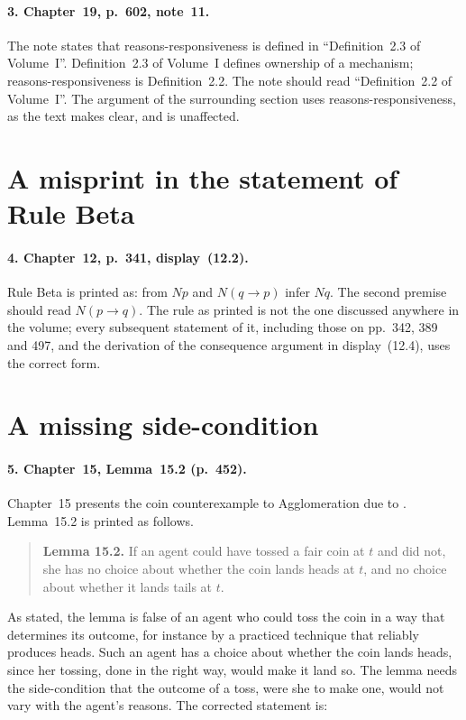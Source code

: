 \documentclass{situationist-preprint}
\begin{document}
\paragraph{3. Chapter~19, p.~602, note~11.} The note states that reasons-responsiveness is defined in \enquote{Definition~2.3 of Volume~I}. Definition~2.3 of Volume~I defines ownership of a mechanism; reasons-responsiveness is Definition~2.2. The note should read \enquote{Definition~2.2 of Volume~I}. The argument of the surrounding section uses reasons-responsiveness, as the text makes clear, and is unaffected.

\section{A misprint in the statement of Rule Beta}

\paragraph{4. Chapter~12, p.~341, display~(12.2).} Rule Beta is printed as: from $Np$ and $N(q \to p)$ infer $Nq$. The second premise should read $N(p \to q)$. The rule as printed is not the one discussed anywhere in the volume; every subsequent statement of it, including those on pp.~342, 389 and 497, and the derivation of the consequence argument in display~(12.4), uses the correct form.

\section{A missing side-condition}

\paragraph{5. Chapter~15, Lemma~15.2 (p.~452).} Chapter~15 presents the coin counterexample to Agglomeration due to \citet{McKayJohnson1996}. Lemma~15.2 is printed as follows.

\begin{quote}\small
\textbf{Lemma 15.2.} If an agent could have tossed a fair coin at $t$ and did not, she has no choice about whether the coin lands heads at $t$, and no choice about whether it lands tails at $t$.
\end{quote}

As stated, the lemma is false of an agent who could toss the coin in a way that determines its outcome, for instance by a practiced technique that reliably produces heads. Such an agent has a choice about whether the coin lands heads, since her tossing, done in the right way, would make it land so. The lemma needs the side-condition that the outcome of a toss, were she to make one, would not vary with the agent's reasons. The corrected statement is:
\end{document}

